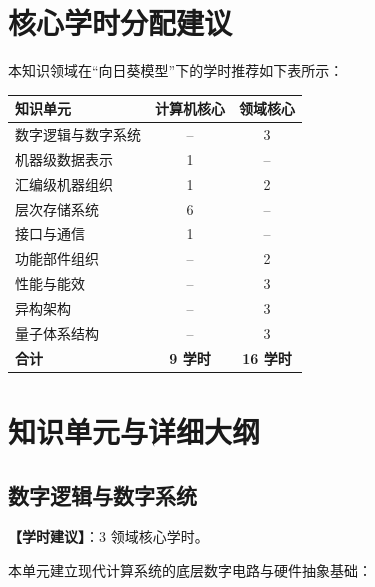 \section{核心学时分配建议}

本知识领域在“向日葵模型”下的学时推荐如下表所示：

\begin{table}[H]
\centering
\setlength{\tabcolsep}{3.5pt}\fontsize{8pt}{9.6pt}\selectfont\begin{tabularx}{\columnwidth}{Y c c}
\toprule
\textbf{知识单元} & \textbf{计算机核心} & \textbf{领域核心} \\
\midrule
数字逻辑与数字系统 & -- & 3 \\
机器级数据表示 & 1 & -- \\
汇编级机器组织 & 1 & 2 \\
层次存储系统 & 6 & -- \\
接口与通信 & 1 & -- \\
功能部件组织 & -- & 2 \\
性能与能效 & -- & 3 \\
异构架构 & -- & 3 \\
量子体系结构 & -- & 3 \\
\midrule
\textbf{合计} & \textbf{9 学时} & \textbf{16 学时} \\
\bottomrule
\end{tabularx}
\end{table}

\section{知识单元与详细大纲}

\subsection{数字逻辑与数字系统}
\textbf{【学时建议】}：3 领域核心学时。

本单元建立现代计算系统的底层数字电路与硬件抽象基础：

